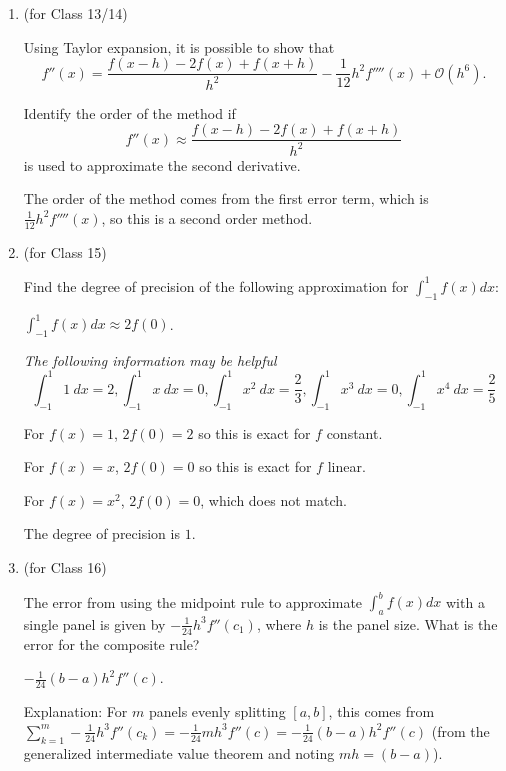 \documentclass[12pt,letterpaper,answers]{exam}
\begin{document}
\begin{enumerate}
\item (for Class 13/14)

Using Taylor expansion, it is possible to show that \[f''(x) = \dfrac{f(x-h)-2f(x)+f(x+h)}{h^2} - \frac{1}{12}h^2 f''''(x) + \mathcal{O}(h^6).\]

Identify the order of the method if 
\[f''(x) \approx \dfrac{f(x-h)-2f(x)+f(x+h)}{h^2}\]
is used to approximate the second derivative.

\begin{solution}
The order of the method comes from the first error term, which is $\frac{1}{12}h^2f''''(x)$, so this is a second order method.
\end{solution}

\setcounter{enumi}{14}
\item (for Class 15)

Find the degree of precision of the following approximation for $\displaystyle\int_{-1}^1 f(x)dx$:

$\displaystyle\int_{-1}^1 f(x)dx\approx 2f(0)$.

\emph{The following information may be helpful}
\[\int_{-1}^1 1\ dx = 2, \int_{-1}^1 x\ dx = 0, \int_{-1}^1 x^2\ dx = \frac{2}{3}, \int_{-1}^1 x^3\ dx =0, \int_{-1}^1 x^4\ dx = \frac{2}{5}\]

\begin{solution}
For $f(x) = 1$, $2f(0) = 2$ so this is exact for $f$ constant.

For $f(x) = x$, $2f(0) = 0$ so this is exact for $f$ linear.

For $f(x) = x^2$, $2f(0) = 0$, which does not match.

The degree of precision is $1$.
\end{solution}


\item (for Class 16)

The error from using the midpoint rule to approximate $\int_a^b f(x)dx$ with a single panel is given by $-\frac{1}{24}h^3f''(c_1)$, where $h$ is the panel size.  What is the error for the composite rule?

\begin{solution}
$-\frac{1}{24}(b-a)h^2f''(c)$.  

Explanation:
For $m$ panels evenly splitting $[a,b]$, this comes from $\sum\limits_{k=1}^m -\frac{1}{24}h^3f''(c_k) = -\frac{1}{24}mh^3f''(c) = -\frac{1}{24}(b-a)h^2f''(c)$ (from the generalized intermediate value theorem and noting $mh = (b-a)$).


\end{solution}
\end{enumerate}
\end{document}

